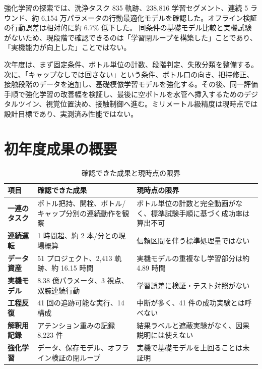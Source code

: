 強化学習の探索では、洗浄タスク 835 軌跡、238,816 学習セグメント、連続 5 ラウンド、約 6,154 万パラメータの行動最適化モデルを確認した。オフライン検証の行動誤差は相対的に約 6.7\% 低下した。 同条件の基礎モデル比較と実機試験がないため、現段階で確認できるのは「学習閉ループを構築した」ことであり、「実機能力が向上した」ことではない。

次年度は、まず固定条件、ボトル単位の計数、段階判定、失敗分類を整備する。次に、「キャップなしでは回さない」という条件、ボトル口の向き、把持修正、接触段階のデータを追加し、基礎模倣学習モデルを強化する。その後、同一評価手順で強化学習の改善幅を検証し、最後に空ボトルを水管へ挿入するためのデジタルツイン、視覚位置決め、接触制御へ進む。ミリメートル級精度は現時点では設計目標であり、実測済み性能ではない。


\section*{初年度成果の概要}
\begin{table}[H]
\centering
\small
\caption{確認できた成果と現時点の限界}
\begin{tabularx}{\textwidth}{>{\japanesesans\bfseries}p{30mm}p{41mm}X}
\toprule
項目 & 確認できた成果 & 現時点の限界\\
\midrule
一連のタスク & ボトル把持、開栓、ボトル/キャップ分別の連続動作を観察 & ボトル単位の計数と完全動画がなく、標準試験手順に基づく成功率は算出不可\\
連続運転 & 1 時間超、約 2 本/分との現場概算 & 信頼区間を伴う標準処理量ではない\\
データ資産 & 51 プロジェクト、2,413 軌跡、約 16.15 時間 & 実機モデルの重複なし学習部分は約 4.89 時間\\
実機モデル & 8.38 億パラメータ、3 視点、双腕連続行動 & 学習誤差に検証・テスト対照がない\\
工程反復 & 41 回の追跡可能な実行、14 構成 & 中断が多く、41 件の成功実験とは呼べない\\
解釈用記録 & アテンション重みの記録 8,223 件 & 結果ラベルと遮蔽実験がなく、因果説明には使えない\\
強化学習 & データ、保存モデル、オフライン検証の閉ループ & 実機で基礎モデルを上回ることは未証明\\
\bottomrule
\end{tabularx}
\end{table}
